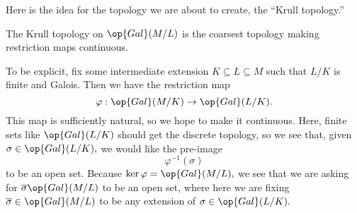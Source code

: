 \documentclass[../notes.tex]{subfiles}
\begin{document}
Here is the idea for the topology we are about to create, the ``Krull topology.''
\begin{idea}
	The Krull topology on $\op{Gal}(M/L)$ is the coarsest topology making restriction maps continuous.
\end{idea}
To be explicit, fix some intermediate extension $K\subseteq L\subseteq M$ such that $L/K$ is finite and Galois. Then we have the restriction map
\[\varphi:\op{Gal}(M/K)\to\op{Gal}(L/K).\]
This map is sufficiently natural, so we hope to make it continuous. Here, finite sets like $\op{Gal}(L/K)$ should get the discrete topology, so we see that, given $\sigma\in\op{Gal}(L/K),$ we would like the pre-image
\[\varphi^{-1}(\sigma)\]
to be an open set. Because $\ker\varphi=\op{Gal}(M/L),$ we see that we are asking for $\overline\sigma\op{Gal}(M/L)$ to be an open set, where here we are fixing $\overline\sigma\in\op{Gal}(M/L)$ to be any extension of $\sigma\in\op{Gal}(L/K).$
\end{document}
